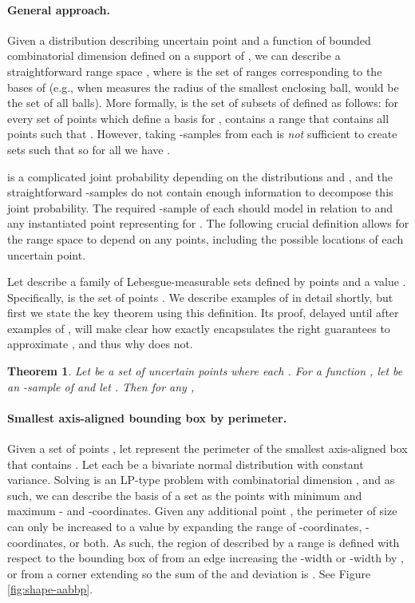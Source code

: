 \documentclass{journal}
\newcommand{\pset}{support\xspace}
\newtheorem {theorem}{Theorem}[section]
\begin{document}
\paragraph{General approach.}
Given a distribution  describing uncertain point  and a function  of bounded combinatorial dimension  defined on a \pset of , we can describe a straightforward range space , where  is the set of ranges corresponding to the bases of  (e.g., when  measures the radius of the smallest enclosing ball,  would be the set of all balls).
More formally,  is the set of subsets of  defined as follows: for every set of  points which define a basis  for ,  contains a range  that contains all points  such that .
However, taking -samples from each  is \emph{not} sufficient to create sets  such that  so for all  we have .

 is a complicated joint probability depending on the  distributions and , and the  straightforward -samples do not contain enough information to decompose this joint probability.  
The required -sample of each  should model  in relation to  and any instantiated point  representing  for .  
The following crucial definition allows for the range space to depend on any  points, including the possible locations of each uncertain point.  

Let  describe a family of Lebesgue-measurable sets defined by  points  and a value .  Specifically,  is the set of points .
We describe examples of  in detail shortly, but first we state the key theorem using this definition.  Its proof, delayed until after examples of , will make clear how  exactly encapsulates the right guarantees to approximate , and thus why  does not.  


\begin{theorem} \label{thm:n-apx}
Let  be a set of uncertain points where each .  
For a function , let  be an -sample of  and let .
Then for any , 

\end{theorem}


\paragraph{Smallest axis-aligned bounding box by perimeter.}
Given a set of points , let  represent the perimeter of the smallest axis-aligned box that contains .  Let each  be a bivariate normal distribution with constant variance.  Solving  is an LP-type problem with combinatorial dimension , and as such, we can describe the basis  of a set  as the points with minimum and maximum - and -coordinates.  Given any additional point , the perimeter of size  can only be increased to a value  by expanding the range of -coordinates, -coordinates, or both.  As such, the region of  described by a range  is defined with respect to the bounding box of  from an edge increasing the -width or -width by , or from a corner extending so the sum of the  and  deviation is .  
See Figure \ref{fig:shape-aabbp}.
\end{document}
